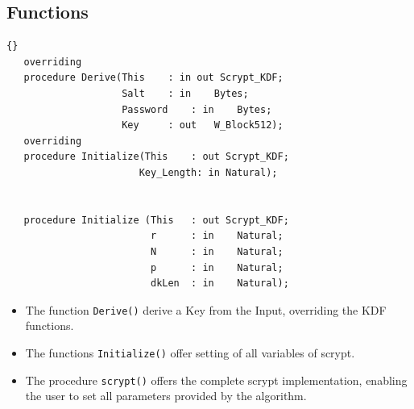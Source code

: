\subsection*{Functions}
\begin{lstlisting}{}
   overriding
   procedure Derive(This	: in out Scrypt_KDF;
                    Salt	: in 	Bytes;
                    Password	: in	Bytes;
                    Key		: out	W_Block512);
   overriding
   procedure Initialize(This	: out Scrypt_KDF;
                       Key_Length: in Natural);


   procedure Initialize (This	: out Scrypt_KDF;
                         r		: in 	Natural;
                         N		: in 	Natural;
                         p		: in	Natural;
                         dkLen	: in	Natural);

\end{lstlisting}
\begin{itemize}
	\item The function \texttt{Derive()} derive a Key from the Input, overriding the KDF functions.
	\item The functions \texttt{Initialize()} offer setting of all variables of scrypt.
	\item The procedure \texttt{scrypt()} offers the complete scrypt implementation, enabling the user to set all parameters provided by the algorithm.
\end{itemize}

